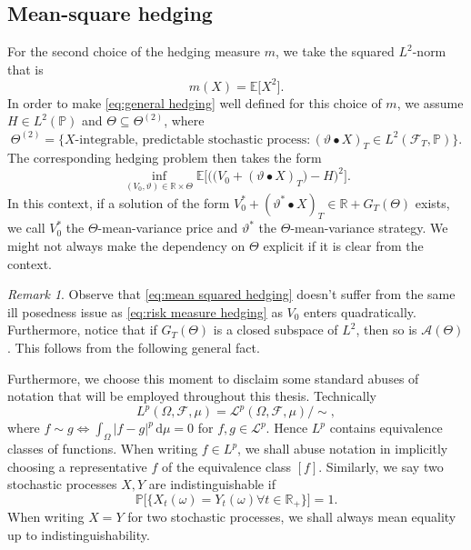 \documentclass[11pt,a4paper,twoside,openany]{report}
\numberwithin{equation}{section}
\newcommand{\diff}{\mathrm{d}}
\theoremstyle{plain} %
\theoremstyle{definition} %
\theoremstyle{remark} %
\newtheorem{remark}[theorem]{Remark}
\begin{document}
\subsection{Mean-square hedging}\label{sec:high level discussion of mean-square hedging}
For the second choice of the hedging measure \(m\), we take the squared \(L^2\)-norm that is 
\begin{equation*}
    m(X)=\mathbb{E}\big[X^2\big].
\end{equation*}
In order to make \eqref{eq:general hedging} well defined for this choice of \(m\), we assume \(H\in L^2(\mathbb{P})\) and \(\Theta\subseteq\Theta^{(2)}\), where
\begin{equation}\label{eq:Theta2}
    \Theta^{(2)}=\{X\text{-integrable, predictable stochastic process}:(\vartheta\bullet X)_T\in L^2(\mathcal{F}_T,\mathbb{P})\} .
\end{equation}
The corresponding hedging problem then takes the form 
\begin{equation}\label{eq:mean squared hedging}
\inf_{(V_0,\vartheta)\in\mathbb{R}\times \Theta}\mathbb{E}\Big[\Big(\big(V_0+(\vartheta\bullet X)_T\big)-H\Big)^2\Big].
\end{equation}
In this context, if a solution of the form \(V_0^*+(\vartheta^*\bullet X)_T\in\mathbb{R}+ G_T(\Theta)\) exists, we call \(V_0^*\) the \(\Theta\)-mean-variance price and \(\vartheta^*\) the \(\Theta\)-mean-variance strategy. We might not always make the dependency on \(\Theta\) explicit if it is clear from the context.
\begin{remark}\label{rem:if G_T closed then mean variance hedging is projection onto closed hilbert subspace}
    Observe that \eqref{eq:mean squared hedging} doesn't suffer from the same ill posedness issue as \eqref{eq:risk measure hedging} as \(V_0\) enters quadratically.
Furthermore, notice that if \(G_T(\Theta)\) is a closed subspace of \(L^2\), then so is \(\mathcal{A}(\Theta)\). This follows from the following general fact.
\end{remark}
Furthermore, we choose this moment to disclaim some standard abuses of notation that will be employed throughout this thesis. Technically 
\begin{equation*}
L^p(\Omega,\mathcal{F},\mu)=\mathcal{L}^p(\Omega,\mathcal{F},\mu)/\sim,
\end{equation*} 
where \(f\sim g\iff \int_{\Omega}|f-g|^p\,\diff \mu=0\) for \(f,g\in \mathcal{L}^p\).
Hence \(L^p\) contains equivalence classes of functions. When writing \(f\in L^p\), we shall abuse notation in implicitly choosing a representative \(f\) of the equivalence class \([f]\). Similarly, we say two stochastic processes \(X,Y\) are indistinguishable if 
\begin{equation*}
    \mathbb{P}\big[\{X_t(\omega)=Y_t(\omega)\forall t\in \mathbb{R}_+\}\big]=1.
\end{equation*}
When writing \(X=Y\) for two stochastic processes, we shall always mean equality up to indistinguishability. 
\end{document}
